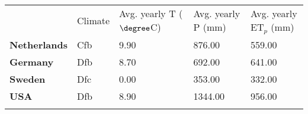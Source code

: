 \begin{tabular}{lllll}
\tophline
 & Climate & Avg. yearly T ($\degree$C) & Avg. yearly P (mm) & Avg. yearly ET$_p$ (mm) \\
\middlehline
\textbf{Netherlands} & Cfb & 9.90 & 876.00 & 559.00 \\
\textbf{Germany} & Dfb & 8.70 & 692.00 & 641.00 \\
\textbf{Sweden} & Dfc & 0.00 & 353.00 & 332.00 \\
\textbf{USA} & Dfb & 8.90 & 1344.00 & 956.00 \\
\bottomhline
\end{tabular}
